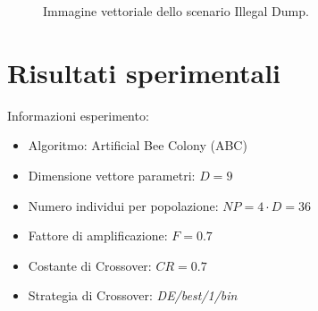 \begin{figure}[H] 
    \captionsetup{justification=centering, margin=2cm, font=footnotesize}
    \begin{center}
    \end{center}
    \caption{Immagine vettoriale dello scenario Illegal Dump.}
    \label{dump_scenario}
\end{figure}

\section{Risultati sperimentali}

Informazioni esperimento:
\begin{itemize}
    \item Algoritmo: Artificial Bee Colony (ABC)
    \item Dimensione vettore parametri: $D = 9$
    \item Numero individui per popolazione: $NP = 4\cdot D = 36$
    \item Fattore di amplificazione: $F = 0.7$
    \item Costante di Crossover: $CR = 0.7$
    \item Strategia di Crossover: \textit{DE/best/1/bin}
\end{itemize}

